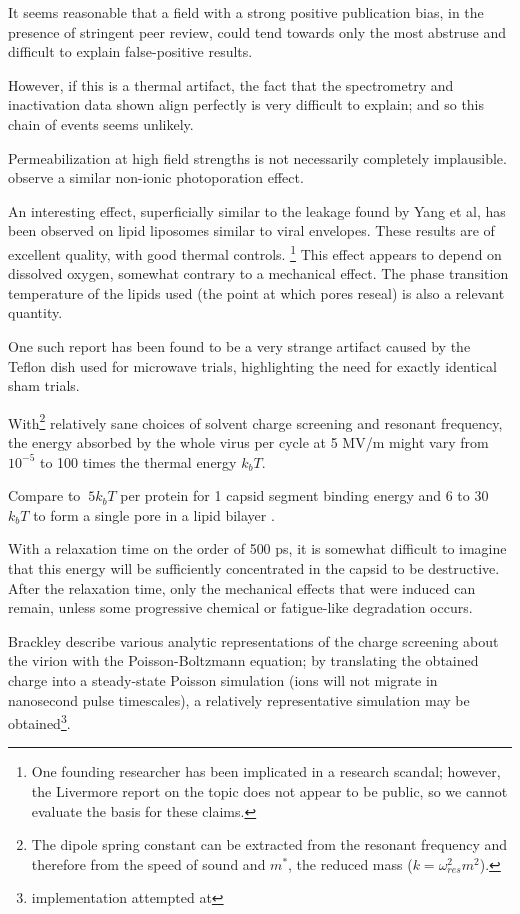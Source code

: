 \documentclass[paper.tex]{subfiles}
\begin{document}
\begin{multicols}{1}
It seems reasonable that a field with a strong positive publication bias\cite{Comprehensive2018}, in the presence of stringent peer review, could tend towards only the most abstruse and difficult to explain false-positive results. 

However, if this is a thermal artifact, the fact that the spectrometry and inactivation data shown align perfectly is very difficult to explain; and so this chain of events seems unlikely.

Permeabilization at high field strengths is not necessarily completely implausible. \cite{182015} observe a similar non-ionic photoporation effect.

An interesting effect, superficially similar to the leakage found by Yang et al, has been observed on lipid liposomes similar to viral envelopes\cite{MicrowaveStimulated1985}\cite{Influence}\cite{Correlation1994}\cite{contribution2019}. These results are of excellent quality, with good thermal controls. \footnote{One founding researcher has been implicated in a research scandal; however, the Livermore report on the topic does not appear to be public, so we cannot evaluate the basis for these claims.} This effect appears to depend on dissolved oxygen\cite{Microwaves1987}\cite{Microwaves1988}, somewhat contrary to a mechanical effect. The phase transition temperature of the lipids used (the point at which pores reseal) is also a relevant quantity. 

One such report has been found to be a very strange artifact caused by the Teflon dish used for microwave trials\cite{Effect1994a}, highlighting the need for exactly identical sham trials.


With\footnote{The dipole spring constant can be extracted from the resonant frequency and therefore from the speed of sound and $m^*$, the reduced mass ($k = \omega_{res}^2 m^2$). } relatively sane choices of solvent charge screening and resonant frequency, the energy absorbed by the whole virus per cycle at 5 MV/m might vary from $10^{-5}$ to 100 times the thermal energy $k_b T$.

Compare to $~5 k_b T$ per protein for 1 capsid segment binding energy \cite{Energies2012} \cite{Weak2002} and 6 to 30 $k_b T$ to form a single pore in a lipid bilayer \cite{Atomistic2014}. 

With a relaxation time on the order of 500 ps, it is somewhat difficult to imagine that this energy will be sufficiently concentrated in the capsid to be destructive. After the relaxation time, only the mechanical effects that were induced can remain, unless some progressive chemical or fatigue-like degradation occurs.


Brackley \cite{Electrostatic2020} describe various analytic representations of the charge screening about the virion with the Poisson-Boltzmann equation; by translating the obtained charge into a steady-state Poisson simulation (ions will not migrate in nanosecond pulse timescales), a relatively representative simulation may be obtained\footnote{implementation attempted at }.

\end{multicols}
\end{document}
